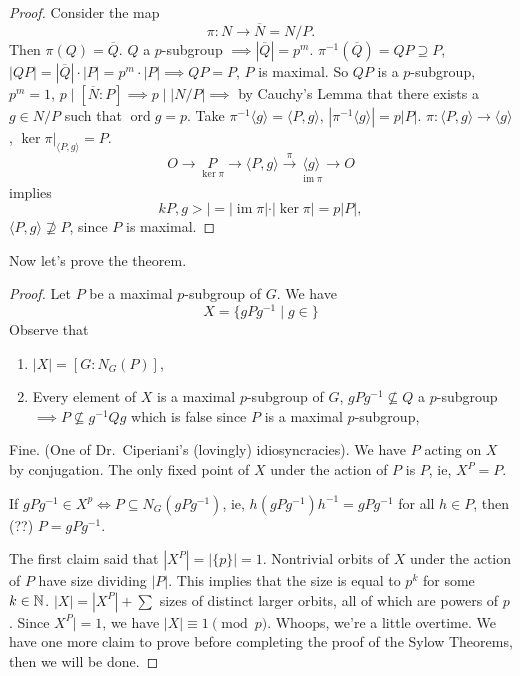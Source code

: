 \begin{proof}
    Consider the map \[
    \pi \colon N \to \overline{N} = N /P.
\] Then $\pi(Q)=\overline{Q}.$ $Q$ a $p$-subgroup $\implies |\overline{Q}|=p^{m}$. $\pi^{-1}(\overline{Q})=QP \supseteq P$, $|QP|=|\overline{Q}|\cdot |P|=p^{m}\cdot |P| \implies QP=P$, $P$ is maximal. So $QP$ is a $p$-subgroup, $p^{m}=1$, $p \mid [\overline{N}:P]\implies p  \mid |N /P| \implies $ by Cauchy's Lemma that there exists a $g\in N /P$ such that $\operatorname{ord}g=p$. Take $\pi^{-1}\langle g \rangle =\langle P,g \rangle $, $|\pi^{-1}\langle g \rangle|=p |P|$. $\pi \colon \langle P,g \rangle  \to \langle g \rangle $, $\operatorname{ker}\pi|_{\langle P,g \rangle }=P$. \[
O \to \underset{\operatorname{ker}\pi}{P} \to \langle P,g \rangle \overset{\pi}{\to } \underset{\operatorname{im}\pi}{\langle g \rangle} \to O
\] implies \[
kP, g>|=|\operatorname{im}\pi|\cdot |\operatorname{ker}\pi|=p|P|,
\] $\langle P,g \rangle \not\supseteq P$, since $P$ is maximal.
\end{proof}
Now let's prove the theorem.
\begin{proof}
    Let $P$ be a maximal $p$-subgroup of $G$. We have \[
    X= \{gPg^{-1} \mid g\in \} 
    \] Observe that 
    \begin{enumerate}
        \item $|X|=[G:N_G(P)]$,
        \item Every element of $X$ is a maximal $p$-subgroup of $G$, $gPg^{-1} \not \subseteq Q$ a $p$-subgroup $\implies P \not\subseteq g^{-1}Qg$ which is false since $P$ is a maximal $p$-subgroup,
    \end{enumerate} Fine. (One of Dr.\ Ciperiani's (lovingly) idiosyncracies).
    We have $P$ acting on $X$ by conjugation. The only fixed point of $X$ under the action of $P$ is $P$, ie, $X^{P}=P$. 
\begin{claim}
    If $gPg^{-1}\in X^{p}\iff P \subseteq N_G(gPg^{-1})$, ie, $h(gPg^{-1})h^{-1}=gPg^{-1}$ for all $h\in P$, then (??) $P=gPg^{-1}$.
\end{claim}
The first claim said that $|X^{P}|=|\{p\}|=1$. Nontrivial orbits of $X$ under the action of $P$ have size dividing $|P|$. This implies that the size is equal to $p^{k}$ for some $k \in \mathbb{N}$. $|X|=|X^{P}|+\sum$ sizes of distinct larger orbits, all of which are powers of $p$. Since $X^{P}|=1$, we have $|X| \equiv 1 \pmod p$. Whoops, we're a little overtime. We have one more claim to prove before completing the proof of the Sylow Theorems, then we will be done.
\end{proof}



